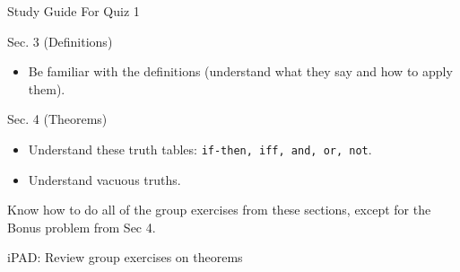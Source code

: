 \documentclass[10pt]{beamer}
\begin{document}
\begin{frame}{Study Guide For Quiz 1}


\begin{myredbox}[title=Readings (1 question)]
Sec. 3 (Definitions)
\begin{itemize}
\item Be familiar with the definitions (understand what they say and how to apply them).  
\end{itemize}
Sec. 4 (Theorems)
\begin{itemize}
\item Understand these truth tables: \texttt{if-then, iff, and, or, not}.
\item Understand vacuous truths.
\end{itemize}

\end{myredbox}

\vfill 

\begin{myyellowbox}[title=Group exercises (2 questions)]
Know how to do all of the group exercises from these sections, except for the Bonus problem from Sec 4.
\end{myyellowbox}


\end{frame}



\begin{frame}[standout]
iPAD: Review group exercises on theorems	
\end{frame}
\end{document}
